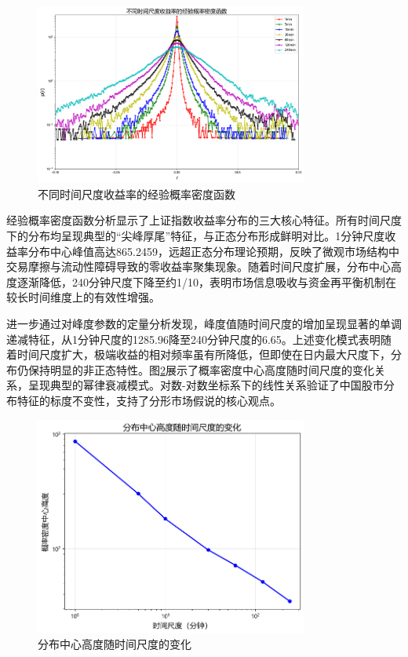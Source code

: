 \documentclass[12pt, a4paper]{article}
\begin{document}
\begin{figure}[htbp]
  \centering
  \includegraphics[width=0.8\textwidth]{../assets/img/经验概率密度.png}
  \caption{不同时间尺度收益率的经验概率密度函数}
  \label{fig:pdf_comparison}
  \end{figure}

经验概率密度函数分析显示了上证指数收益率分布的三大核心特征。所有时间尺度下的分布均呈现典型的“尖峰厚尾”特征，与正态分布形成鲜明对比。1分钟尺度收益率分布中心峰值高达865.2459，远超正态分布理论预期，反映了微观市场结构中交易摩擦与流动性障碍导致的零收益率聚集现象。随着时间尺度扩展，分布中心高度逐渐降低，240分钟尺度下降至约1/10，表明市场信息吸收与资金再平衡机制在较长时间维度上的有效性增强。

进一步通过对峰度参数的定量分析发现，峰度值随时间尺度的增加呈现显著的单调递减特征，从1分钟尺度的1285.96降至240分钟尺度的6.65。上述变化模式表明随着时间尺度扩大，极端收益的相对频率虽有所降低，但即使在日内最大尺度下，分布仍保持明显的非正态特性。图\ref{fig:distribution}展示了概率密度中心高度随时间尺度的变化关系，呈现典型的幂律衰减模式。对数-对数坐标系下的线性关系验证了中国股市分布特征的标度不变性，支持了分形市场假说的核心观点。

\begin{figure}[htbp]
  \centering
  \includegraphics[width=0.8\textwidth]{../assets/img/分布中心高度随时间尺度的变化.png}
  \caption{分布中心高度随时间尺度的变化}
  \label{fig:distribution}
  \end{figure}
\end{document}

